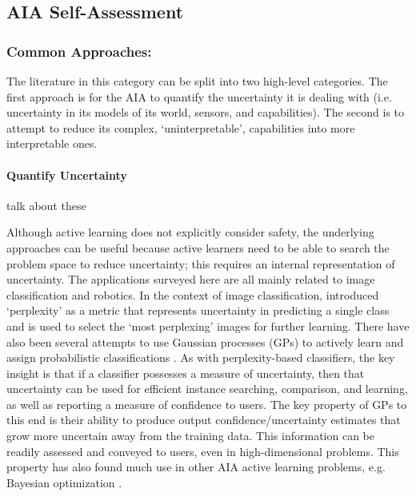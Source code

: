 \subsection{AIA Self-Assessment} \label{sec:aia_self_assessment}

\subsubsection{Common Approaches:}
The literature in this category can be split into two high-level categories. The first approach is for the AIA to quantify the uncertainty it is dealing with (i.e. uncertainty in its models of its world, sensors, and capabilities). The second is to attempt to reduce its complex, `uninterpretable', capabilities into more interpretable ones.

\paragraph{Quantify Uncertainty} \label{sec:QU}
talk about these \citet{Wu2012-qi, Chen2018-xq, Choi2017-th, Kahn2017-vy, Peterson2017-dd, Kendall2017-ry, Zhang2014-he, Churchill2015-ei, Paul2011-vr, Grimmett2013-gj, Triebel2013-ku, Triebel2013-ow, Triebel2016-kj, Berczi2015-rd, Grimmett2016-yc, Dequaire2016-kh, Gurau2016-hs, Kuter2015-qh, Aitken2016-cv, MacKay1992-sp, Zagorecki2015-qy, Hutchins2015-if, Laskey1991-mf, Kaipa2015-hy, Habbema1976-xd}

Although active learning does not explicitly consider safety, the underlying approaches can be useful because active learners need to be able to search the problem space to reduce uncertainty; this requires an internal representation of uncertainty. The applications surveyed here are all mainly related to image classification and robotics. In the context of image classification, \citet{Paul2011-vr} introduced `perplexity' as a metric that represents uncertainty in predicting a single class and is used to select the `most perplexing' images for further learning. There have also been several attempts to use Gaussian processes (GPs) to actively learn and assign probabilistic classifications \cite{MacKay1992-sp,Triebel2016-kj,Triebel2013-ow,Triebel2013-ku,Grimmett2013-gj,Grimmett2016-yc,Berczi2015-rd,Dequaire2016-kh}. As with perplexity-based classifiers, the key insight is that if a classifier possesses a measure of uncertainty, then that uncertainty can be used for efficient instance searching, comparison, and learning, as well as reporting a measure of confidence to users. The key property of GPs to this end is their ability to produce output confidence/uncertainty estimates that grow more uncertain away from the training data. This information can be readily assessed and conveyed to users, even in high-dimensional problems. This property has also found much use in other AIA active learning problems, e.g. Bayesian optimization \cite{Snoek2012-tt, Brochu2010-tj,Israelsen2017-zb}. 

